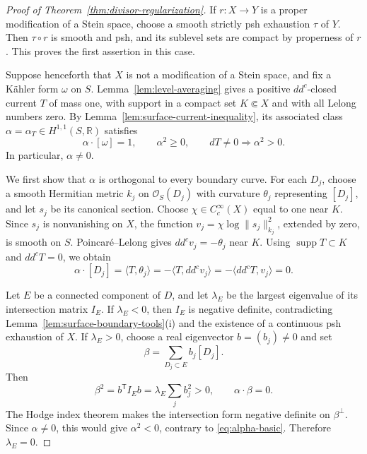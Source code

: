 \documentclass[11pt]{amsart}
\theoremstyle{definition}
\theoremstyle{remark}
\numberwithin{equation}{section}
\newcommand{\R}{\mathbb R}
\newcommand{\OO}{\mathcal O}
\newcommand{\ddc}{dd^c}
\newcommand{\supp}{\operatorname{supp}}
\begin{document}
\begin{proof}[Proof of Theorem~\ref{thm:divisor-regularization}]
If $r:X\to Y$ is a proper modification of a Stein space, choose
a smooth strictly psh exhaustion $\tau$ of $Y$. Then $\tau\circ r$
is smooth and psh, and its sublevel sets are compact by properness
of $r$. This proves the first assertion in this case.

Suppose henceforth that $X$ is not a modification of a Stein space,
and fix a K\"ahler form $\omega$ on $S$.
Lemma~\ref{lem:level-averaging} gives a positive $\ddc$-closed
current $T$ of mass one, with support in a compact set $K\Subset X$
and with all Lelong numbers zero.
By Lemma~\ref{lem:surface-current-inequality}, its associated class
$\alpha=\alpha_T\in H^{1,1}(S,\R)$ satisfies
\begin{equation}\label{eq:alpha-basic}
 \alpha\cdot[\omega]=1,\qquad \alpha^2\ge0,
 \qquad dT\ne0\Longrightarrow\alpha^2>0.
\end{equation}
In particular, $\alpha\ne0$.

We first show that $\alpha$ is orthogonal to every boundary curve.
For each $D_j$, choose a smooth Hermitian metric $k_j$ on
$\OO_S(D_j)$ with curvature $\theta_j$ representing $[D_j]$,
and let $s_j$ be its canonical section. Choose
$\chi\in C_c^\infty(X)$ equal to one near $K$.
Since $s_j$ is nonvanishing on $X$, the function
$v_j=\chi\log\|s_j\|_{k_j}^2$, extended by zero, is smooth on $S$.
Poincar\'e--Lelong gives $\ddc v_j=-\theta_j$ near $K$.
Using $\supp T\subset K$ and $\ddc T=0$, we obtain
\begin{equation}\label{eq:alpha-boundary-orthogonality}
 \alpha\cdot[D_j]
 =\langle T,\theta_j\rangle
 =-\langle T,\ddc v_j\rangle
 =-\langle\ddc T,v_j\rangle=0.
\end{equation}

Let $E$ be a connected component of $D$, and let $\lambda_E$
be the largest eigenvalue of its intersection matrix $I_E$.
If $\lambda_E<0$, then $I_E$ is negative definite, contradicting
Lemma~\ref{lem:surface-boundary-tools}\textup{(i)} and the existence
of a continuous psh exhaustion of $X$.
If $\lambda_E>0$, choose a real eigenvector $b=(b_j)\ne0$ and set
\[
 \beta=\sum_{D_j\subset E}b_j[D_j].
\]
Then
\[
 \beta^2=b^{\mathsf T}I_Eb
         =\lambda_E\sum_j b_j^2>0,
 \qquad \alpha\cdot\beta=0.
\]
The Hodge index theorem makes the intersection form negative
definite on $\beta^\perp$. Since $\alpha\ne0$, this would give
$\alpha^2<0$, contrary to \eqref{eq:alpha-basic}.
Therefore $\lambda_E=0$.


\end{proof}
\end{document}
